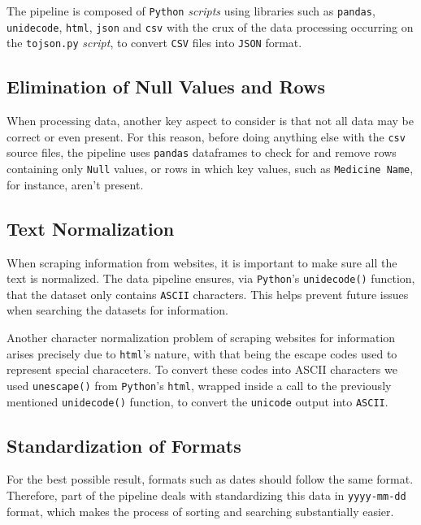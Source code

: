 \documentclass[sigconf]{acmart}
\begin{document}
The pipeline is composed of \texttt{Python} \textit{scripts} using libraries such as \texttt{pandas}, \texttt{unidecode}, \texttt{html}, \texttt{json} and \texttt{csv} with the crux of the data processing occurring on the \texttt{to{\textunderscore}json.py} \textit{script}, to convert \texttt{CSV} files into \texttt{JSON} format.

\subsection{Elimination of Null Values and Rows}

When processing data, another key aspect to consider is that not all data may be correct or even present. For this reason, before doing anything else with the \texttt{csv} source files, the pipeline uses \texttt{pandas} dataframes to check for and remove rows containing only \texttt{Null} values, or rows in which key values, such as \texttt{Medicine Name}, for instance, aren't present.

\subsection{Text Normalization}

When scraping information from websites, it is important to make sure all the text is normalized. The data pipeline ensures, via \texttt{Python}'s \texttt{unidecode()} function, that the dataset only contains \texttt{ASCII} characters. This helps prevent future issues when searching the datasets for information.

Another character normalization problem of scraping websites for information arises precisely due to \texttt{html}'s nature, with that being the escape codes used to represent special characeters. To convert these codes into ASCII characters we used \texttt{unescape()} from \texttt{Python}'s \texttt{html}, wrapped inside a call to the previously mentioned \texttt{unidecode()} function, to convert the \texttt{unicode} output into \texttt{ASCII}.

\subsection{Standardization of Formats}

For the best possible result, formats such as dates should follow the same format. Therefore, part of the pipeline deals with standardizing this data in \texttt{yyyy-mm-dd} format, which makes the process of sorting and searching substantially easier. 
\end{document}
